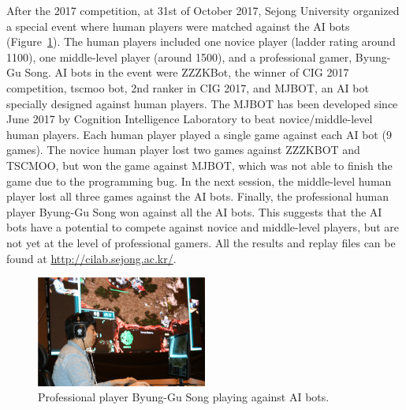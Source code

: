 After the 2017 competition, at 31st of October 2017, Sejong University organized a special event where human players were matched against the AI bots (Figure~\ref{figureSong}). The human players included one novice player (ladder rating around 1100), one middle-level player (around 1500), and a professional gamer, Byung-Gu Song. AI bots in the event were ZZZKBot, the winner of CIG 2017 competition, tscmoo bot, 2nd ranker in CIG 2017, and MJBOT, an AI bot specially designed against human players. The MJBOT has been developed since June 2017 by Cognition Intelligence Laboratory  to beat novice/middle-level human players. 
Each human player played a single game against each AI bot (9 games). 
The novice human player lost two games against ZZZKBOT and TSCMOO, but won the game against MJBOT, which was not able to finish the game due to the programming bug. In the next session, the middle-level human player lost all three games against the AI bots. Finally, the professional human player Byung-Gu Song won against all the AI bots. This suggests that the AI bots have a potential to compete against novice and middle-level players, but are not yet at the level of professional gamers. All the results and replay files can be found at {\url{http://cilab.sejong.ac.kr/}}. 

\begin{figure}[t]
  \centering
  \includegraphics[width=0.5\textwidth]{fig/song_human_ai.png}
  \caption{Professional player Byung-Gu Song playing against AI bots.}
  \label{figureSong}
\end{figure} 
